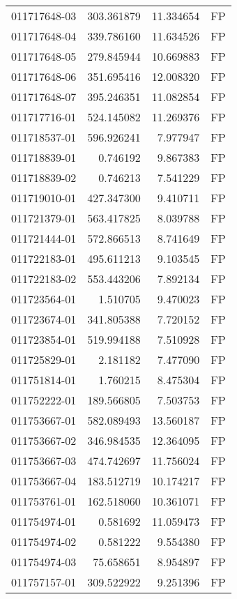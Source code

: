 \begin{tabular}{lrrl}
011717648-03 &  303.361879 &    11.334654 &   FP \\
011717648-04 &  339.786160 &    11.634526 &   FP \\
011717648-05 &  279.845944 &    10.669883 &   FP \\
011717648-06 &  351.695416 &    12.008320 &   FP \\
011717648-07 &  395.246351 &    11.082854 &   FP \\
011717716-01 &  524.145082 &    11.269376 &   FP \\
011718537-01 &  596.926241 &     7.977947 &   FP \\
011718839-01 &    0.746192 &     9.867383 &   FP \\
011718839-02 &    0.746213 &     7.541229 &   FP \\
011719010-01 &  427.347300 &     9.410711 &   FP \\
011721379-01 &  563.417825 &     8.039788 &   FP \\
011721444-01 &  572.866513 &     8.741649 &   FP \\
011722183-01 &  495.611213 &     9.103545 &   FP \\
011722183-02 &  553.443206 &     7.892134 &   FP \\
011723564-01 &    1.510705 &     9.470023 &   FP \\
011723674-01 &  341.805388 &     7.720152 &   FP \\
011723854-01 &  519.994188 &     7.510928 &   FP \\
011725829-01 &    2.181182 &     7.477090 &   FP \\
011751814-01 &    1.760215 &     8.475304 &   FP \\
011752222-01 &  189.566805 &     7.503753 &   FP \\
011753667-01 &  582.089493 &    13.560187 &   FP \\
011753667-02 &  346.984535 &    12.364095 &   FP \\
011753667-03 &  474.742697 &    11.756024 &   FP \\
011753667-04 &  183.512719 &    10.174217 &   FP \\
011753761-01 &  162.518060 &    10.361071 &   FP \\
011754974-01 &    0.581692 &    11.059473 &   FP \\
011754974-02 &    0.581222 &     9.554380 &   FP \\
011754974-03 &   75.658651 &     8.954897 &   FP \\
011757157-01 &  309.522922 &     9.251396 &   FP \\

\end{tabular}
